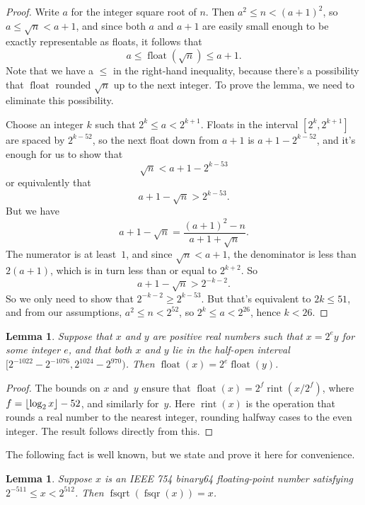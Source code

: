 \documentclass[a4paper]{article}
\DeclarePairedDelimiter\floor{\lfloor}{\rfloor}
\DeclareMathOperator{\fsqrt}{fsqrt}
\DeclareMathOperator{\fsqr}{fsqr}
\DeclareMathOperator{\float}{float}
\DeclareMathOperator{\rint}{rint}
\theoremstyle{plain}
\newtheorem{lemma}[theorem]{Lemma}
\theoremstyle{definition}
\begin{document}
\begin{proof}
  Write $a$ for the integer square root of $n$. Then $a^2 \le n < (a + 1)^2$,
  so $a \le \sqrt n < a + 1$, and since both $a$ and $a + 1$ are easily small
  enough to be exactly representable as floats, it follows that
  $$a \le \float(\sqrt n) \le a + 1.$$
  Note that we have a $\le$ in the right-hand inequality, because there's a
  possibility that $\float$ rounded $\sqrt n$ up to the next integer. To prove
  the lemma, we need to eliminate this possibility.

  Choose an integer $k$ such that $2^k \le a < 2^{k + 1}$. Floats in
  the interval $[2^k, 2^{k+1}]$ are spaced by $2^{k-52}$, so the next
  float down from $a + 1$ is $a + 1 - 2^{k - 52}$, and it's enough for
  us to show that
  $$\sqrt n < a + 1 - 2^{k-53}$$
  or equivalently that
  $$a + 1 - \sqrt n > 2^{k - 53}.$$
  But we have
  $$a + 1 - \sqrt n = \frac{(a + 1)^2 - n}{a + 1 + \sqrt n}.$$
  The numerator is at least~$1$, and since $\sqrt n < a + 1$, the denominator is less
  than $2(a+1)$, which is in turn less than or equal to $2^{k+2}$. So
  $$a + 1 - \sqrt n > 2^{-k-2}.$$
  So we only need to show that $2^{-k-2} \ge 2^{k-53}$. But that's equivalent
  to $2k \le 51$, and from our assumptions, $a^2 \le n < 2^{52}$, so
  $2^k \le a < 2^{26}$, hence $k < 26$.
\end{proof}


\begin{lemma}
  \label{float-scale}
  Suppose that $x$ and $y$ are positive real numbers such that $x = 2^e y$ for
  some integer $e$, and that both $x$ and $y$ lie in the half-open interval
  $[2^{-1022} - 2^{-1076}, 2^{1024} - 2^{970})$. Then $\float(x) = 2^e \float(y)$.
\end{lemma}

\begin{proof}
  The bounds on $x$ and~$y$ ensure that $\float(x) = 2^f \rint(x / 2^f)$, where
  $f = \floor{\log_2 x} - 52$, and similarly for~$y$. Here $\rint(x)$ is the
  operation that rounds a real number to the nearest integer, rounding halfway
  cases to the even integer. The result follows directly from this.
\end{proof}

The following fact is well known, but we state and prove it here for convenience.

\begin{lemma}
  Suppose $x$ is an IEEE 754 binary64 floating-point number satisfying
  $2^{-511} \le x < 2^{512}$. Then $\fsqrt(\fsqr(x)) = x$.
\end{lemma}
\end{document}
